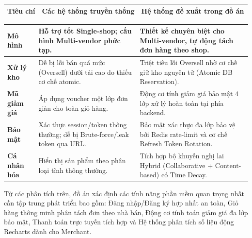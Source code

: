 \documentclass[../DoAn.tex]{subfiles}
\begin{document}
\begin{longtable}{|p{2.5cm}|p{6cm}|p{6cm}|}
\hline
\textbf{Tiêu chí} & \textbf{Các hệ thống truyền thống} & \textbf{Hệ thống đề xuất trong đồ án} \\ \hline
\end{longtable}
\begin{longtable}{|p{2.5cm}|p{6.1cm}|p{6.1cm}|}
\hline
\textbf{Mô hình} & Hỗ trợ tốt Single-shop; cấu hình Multi-vendor phức tạp. & Thiết kế chuyên biệt cho Multi-vendor, tự động tách đơn hàng theo shop. \\ \hline
\textbf{Xử lý kho} & Dễ bị lỗi bán quá mức (Oversell) dưới tải cao do thiếu cơ chế atomic. & Triệt tiêu lỗi Oversell nhờ cơ chế giữ kho nguyên tử (Atomic DB Reservation). \\ \hline
\textbf{Mã giảm giá} & Áp dụng voucher một lớp đơn giản cho toàn giỏ hàng. & Động cơ tính giảm giá bảo mật 4 lớp xử lý hoàn toàn tại phía backend. \\ \hline
\textbf{Bảo mật} & Xác thực session/token thông thường; dễ bị Brute-force/leak token qua URL. & Bảo mật xác thực đa lớp bảo vệ bởi Redis rate-limit và cơ chế Refresh Token Rotation. \\ \hline
\textbf{Cá nhân hóa} & Hiển thị sản phẩm theo phân loại tĩnh thông thường. & Tích hợp bộ khuyến nghị lai Hybrid (Collaborative + Content-based) có Time Decay. \\ \hline
\end{longtable}
\label{table:survey}

Từ các phân tích trên, đồ án xác định các tính năng phần mềm quan trọng nhất cần tập trung phát triển bao gồm: Đăng nhập/Đăng ký hợp nhất an toàn, Giỏ hàng thông minh phân tách đơn theo nhà bán, Động cơ tính toán giảm giá đa lớp bảo mật, Thanh toán trực tuyến tích hợp và Hệ thống phân tích số liệu động Recharts dành cho Merchant.
\end{document}

